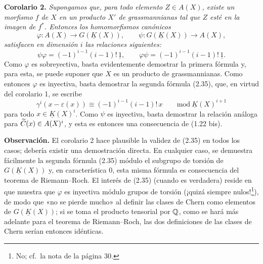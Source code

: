 \textbf{Corolario 2.} \emph{Supongamos que, para todo elemento $Z\in A(X)$, existe un morfismo $f$ de $X$ en un producto $X'$ de grassmannianas tal que $Z$ esté en la imagen de $f^*$. Entonces los homomorfismos canónicos}
\[
 \varphi:A(X)\longrightarrow G(\underline K(X)),\qquad \psi:G(\underline K(X))\longrightarrow A(X),
\]
\emph{satisfacen en dimensión $i$ las relaciones siguientes:}
\begin{equation}\tag{2.35}
 \psi\varphi=(-1)^{i-1}(i-1)!\,\underline 1,\qquad
 \varphi\psi=(-1)^{i-1}(i-1)!\,\underline 1.
\end{equation}
Como $\varphi$ es sobreyectiva, basta evidentemente demostrar la primera fórmula y, para esta, se puede suponer que $X$ es un producto de grassmannianas. Como entonces $\varphi$ es inyectiva, basta demostrar la segunda fórmula (2.35), que, en virtud del corolario 1, se escribe
\[
 \gamma^i(x-\varepsilon(x))\equiv(-1)^{i-1}(i-1)!\,x\qquad\mathrm{mod}\ \underline K(X)^{i+1}
\]
para todo $x\in\underline K(X)^i$. Como $\psi$ es inyectiva, basta demostrar la relación análoga para $\widetilde C(x)\in A(X)^i$, y esta es entonces una consecuencia de (1.22 bis).

\textbf{Observación.} El corolario 2 hace plausible la validez de (2.35) en todos los casos; debería existir una demostración directa. En cualquier caso, se demuestra fácilmente la segunda fórmula (2.35) módulo el subgrupo de torsión de $G(\underline K(X))$ y, en característica $0$, esta misma fórmula es consecuencia del teorema de Riemann--Roch. El interés de (2.35) (cuando es verdadera) reside en que muestra que $\varphi$ es inyectiva módulo grupos de torsión (¡quizá siempre nulos!\footnote{No; cf.\ la nota de la página 30.}), de modo que «no se pierde mucho» al definir las clases de Chern como elementos de $G(\underline K(X))$; si se toma el producto tensorial por $\mathbb Q$, como se hará más adelante para el teorema de Riemann--Roch, las dos definiciones de las clases de Chern serían entonces idénticas.

